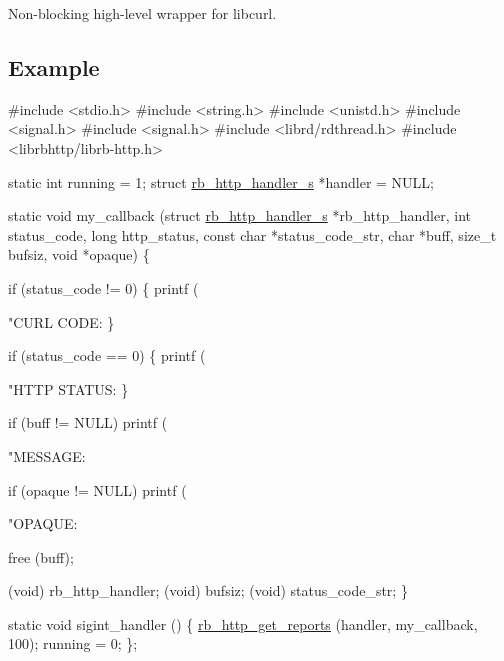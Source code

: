 Non-\/blocking high-\/level wrapper for libcurl.

\subsection*{Example}


\begin{DoxyCode}
\textcolor{preprocessor}{#include <stdio.h>}
\textcolor{preprocessor}{#include <string.h>}
\textcolor{preprocessor}{#include <unistd.h>}
\textcolor{preprocessor}{#include <signal.h>}
\textcolor{preprocessor}{#include <signal.h>}
\textcolor{preprocessor}{#include <librd/rdthread.h>}
\textcolor{preprocessor}{#include <librbhttp/librb-http.h>}

\textcolor{keyword}{static} \textcolor{keywordtype}{int} running = 1;
\textcolor{keyword}{struct }\hyperlink{structrb__http__handler__s}{rb\_http\_handler\_s} *handler = NULL;


\textcolor{keyword}{static} \textcolor{keywordtype}{void} my\_callback (\textcolor{keyword}{struct} \hyperlink{structrb__http__handler__s}{rb\_http\_handler\_s} *rb\_http\_handler,
                         \textcolor{keywordtype}{int} status\_code,
                         \textcolor{keywordtype}{long} http\_status,
                         \textcolor{keyword}{const} \textcolor{keywordtype}{char} *status\_code\_str,
                         \textcolor{keywordtype}{char} *buff,
                         \textcolor{keywordtype}{size\_t} bufsiz,
                         \textcolor{keywordtype}{void} *opaque) \{

    \textcolor{keywordflow}{if} (status\_code != 0) \{
        printf (\textcolor{stringliteral}{"CURL CODE: %
    \}

    \textcolor{keywordflow}{if} (status\_code == 0) \{
        printf (\textcolor{stringliteral}{"HTTP STATUS: %
    \}

    \textcolor{keywordflow}{if} (buff != NULL)
        printf (\textcolor{stringliteral}{"MESSAGE: %

    \textcolor{keywordflow}{if} (opaque != NULL)
        printf (\textcolor{stringliteral}{"OPAQUE: %

    free (buff);

    (void) rb\_http\_handler;
    (void) bufsiz;
    (void) status\_code\_str;
\}

\textcolor{keyword}{static} \textcolor{keywordtype}{void} sigint\_handler () \{
    \hyperlink{librb-http_8h_a890e981b619b1bdd5cc37fa16bb06f06}{rb\_http\_get\_reports} (handler, my\_callback, 100);
    running = 0;
\};

}}}}
\end{DoxyCode}
